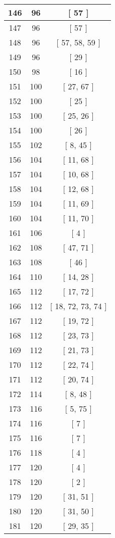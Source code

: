 \begin{center}
\begin{longtable}[H]{|| c c c ||}
\hline
146 & 96 & [ 57 ] \\ 
\hline
147 & 96 & [ 57 ] \\ 
\hline
148 & 96 & [ 57, 58, 59 ] \\ 
\hline
149 & 96 & [ 29 ] \\ 
\hline
150 & 98 & [ 16 ] \\ 
\hline
151 & 100 & [ 27, 67 ] \\ 
\hline
152 & 100 & [ 25 ] \\ 
\hline
153 & 100 & [ 25, 26 ] \\ 
\hline
154 & 100 & [ 26 ] \\ 
\hline
155 & 102 & [ 8, 45 ] \\ 
\hline
156 & 104 & [ 11, 68 ] \\ 
\hline
157 & 104 & [ 10, 68 ] \\ 
\hline
158 & 104 & [ 12, 68 ] \\ 
\hline
159 & 104 & [ 11, 69 ] \\ 
\hline
160 & 104 & [ 11, 70 ] \\ 
\hline
161 & 106 & [ 4 ] \\ 
\hline
162 & 108 & [ 47, 71 ] \\ 
\hline
163 & 108 & [ 46 ] \\ 
\hline
164 & 110 & [ 14, 28 ] \\ 
\hline
165 & 112 & [ 17, 72 ] \\ 
\hline
166 & 112 & [ 18, 72, 73, 74 ] \\ 
\hline
167 & 112 & [ 19, 72 ] \\ 
\hline
168 & 112 & [ 23, 73 ] \\ 
\hline
169 & 112 & [ 21, 73 ] \\ 
\hline
170 & 112 & [ 22, 74 ] \\ 
\hline
171 & 112 & [ 20, 74 ] \\ 
\hline
172 & 114 & [ 8, 48 ] \\ 
\hline
173 & 116 & [ 5, 75 ] \\ 
\hline
174 & 116 & [ 7 ] \\ 
\hline
175 & 116 & [ 7 ] \\ 
\hline
176 & 118 & [ 4 ] \\ 
\hline
177 & 120 & [ 4 ] \\ 
\hline
178 & 120 & [ 2 ] \\ 
\hline
179 & 120 & [ 31, 51 ] \\ 
\hline
180 & 120 & [ 31, 50 ] \\ 
\hline
181 & 120 & [ 29, 35 ] \\ 

\end{longtable}
\end{center}
